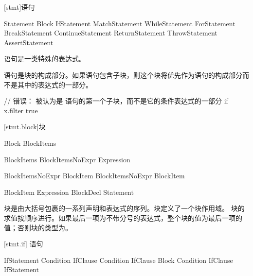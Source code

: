 
[stmt]{语句}

\begin{bnf}{Statement}
    Block \br
    IfStatement \br
    MatchStatement \br
    WhileStatement \br
    ForStatement \br
    BreakStatement \br
    ContinueStatement \br
    ReturnStatement \br
    ThrowStatement \br
    AssertStatement
\end{bnf}

\pnum
语句是一类特殊的表达式。

\pnum
语句是块的构成部分。如果语句包含子块，则这个块将优先作为语句的构成部分而不是其中的表达式的一部分。\enterexample

\begin{codeblock}
// 错误：  被认为是  语句的第一个子块，而不是它的条件表达式的一部分
if x.filter{ true }
\end{codeblock}

\exitexample

[stmt.block]{块}

\begin{bnf}{Block}
    \terminal{\{} BlockItems \terminal{\}}
\end{bnf}

\begin{bnf}{BlockItems}
    BlockItemsNoExpr Expression\bnfs
\end{bnf}

\begin{bnf}{BlockItemsNoExpr}
    BlockItem \br
    BlockItemsNoExpr BlockItem
\end{bnf}

\begin{bnf}{BlockItem}
    Expression \terminal{;} \br
    BlockDecl \br
    Statement
\end{bnf}

\pnum
块是由大括号包裹的一系列声明和表达式的序列。块定义了一个块作用域。
块的求值按顺序进行。如果最后一项为不带分号的表达式，整个块的值为最后一项的值；否则块的类型为。

[stmt.if]{ 语句}

\begin{bnf}{IfStatement}
     Condition IfClause \br
     Condition IfClause  Block \br
     Condition IfClause  IfStatement
\end{bnf}

